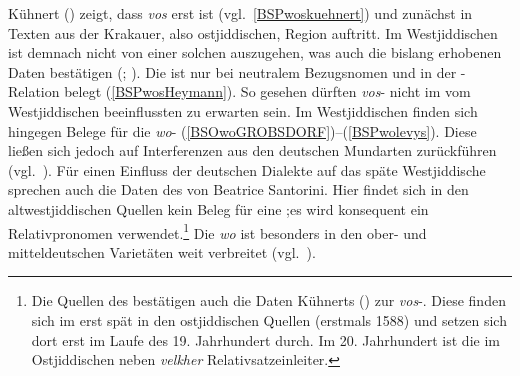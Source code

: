     
Kühnert (\citeyear[47]{Kuehnert2007}) zeigt, dass \textit{vos} erst  ist (vgl.\, \ref{BSPwoskuehnert}) und zunächst in Texten aus der Krakauer, also ostjiddischen, Region auftritt. Im Westjiddischen ist demnach nicht von einer solchen  auszugehen, was auch die bislang erhobenen Daten bestätigen (\citealt{Fleischer2004,Fleischer2004b,Reershemius2007}; \citealt[33f]{Schaefer2008,Schaefer2014}). Die  ist nur bei neutralem Bezugsnomen und in der -Relation belegt (\ref{BSPwosHeymann}). So gesehen dürften \textit{vos}- nicht im vom Westjiddischen beeinflussten \hai{{\LiJieins}} zu erwarten sein. Im Westjiddischen finden sich hingegen Belege für die \textit{wo}- (\ref{BSOwoGROBSDORF})–(\ref{BSPwolevys}). Diese ließen sich jedoch auf Interferenzen aus den deutschen Mundarten zurückführen \,%
 (vgl.\, \citealt{Schaefer2014}). Für einen Einfluss der deutschen Dialekte auf das späte Westjiddische sprechen auch die Daten des   von Beatrice Santorini. Hier findet sich in den altwestjiddischen Quellen kein Beleg für eine ;es wird konsequent ein Relativpronomen verwendet.\footnote{Die Quellen des  bestätigen auch die Daten Kühnerts (\citeyear{Kuehnert2007}) zur \textit{vos}-. Diese finden sich im   erst spät in den ostjiddischen Quellen (erstmals 1588) und setzen sich dort erst im Laufe des 19. Jahrhundert durch. Im 20. Jahrhundert ist die  im Ostjiddischen neben \textit{velkher} Relativsatzeinleiter.} Die  \textit{wo} ist besonders in den ober- und mitteldeutschen Varietäten weit verbreitet (vgl.\, \citealt{Fleischer2004c,Fleischer2004d,Fleischer2010}).  

